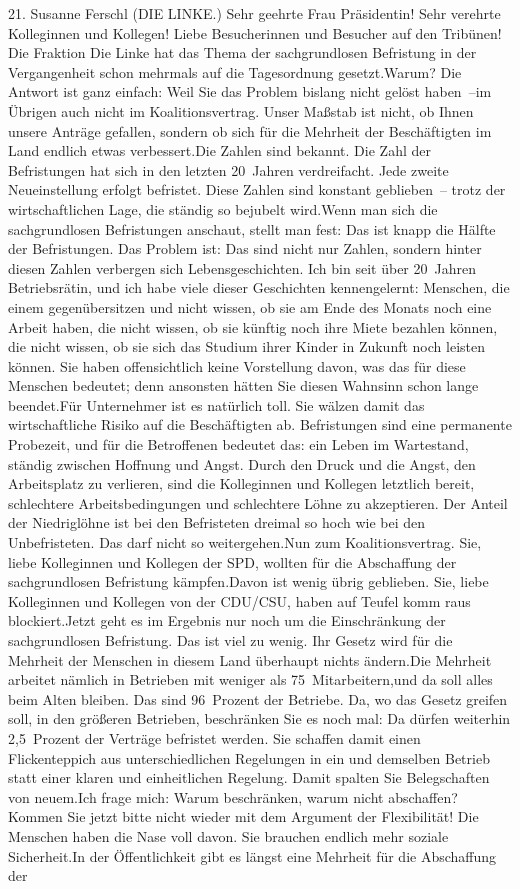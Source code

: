 \documentclass{article}
\begin{document}
	21. Susanne Ferschl (DIE LINKE.) Sehr geehrte Frau Präsidentin! Sehr verehrte Kolleginnen und Kollegen! Liebe Besucherinnen und Besucher auf den Tribünen! Die Fraktion Die Linke hat das Thema der sachgrundlosen Befristung in der Vergangenheit schon mehrmals auf die Tagesordnung gesetzt.Warum? Die Antwort ist ganz einfach: Weil Sie das Problem bislang nicht gelöst haben –im Übrigen auch nicht im Koalitionsvertrag. Unser Maßstab ist nicht, ob Ihnen unsere Anträge gefallen, sondern ob sich für die Mehrheit der Beschäftigten im Land endlich etwas verbessert.Die Zahlen sind bekannt. Die Zahl der Befristungen hat sich in den letzten 20 Jahren verdreifacht. Jede zweite Neueinstellung erfolgt befristet. Diese Zahlen sind konstant geblieben – trotz der wirtschaftlichen Lage, die ständig so bejubelt wird.Wenn man sich die sachgrundlosen Befristungen anschaut, stellt man fest: Das ist knapp die Hälfte der Befristungen. Das Problem ist: Das sind nicht nur Zahlen, sondern hinter diesen Zahlen verbergen sich Lebensgeschichten. Ich bin seit über 20 Jahren Betriebsrätin, und ich habe viele dieser Geschichten kennengelernt: Menschen, die einem gegenübersitzen und nicht wissen, ob sie am Ende des Monats noch eine Arbeit haben, die nicht wissen, ob sie künftig noch ihre Miete bezahlen können, die nicht wissen, ob sie sich das Studium ihrer Kinder in Zukunft noch leisten können. Sie haben offensichtlich keine Vorstellung davon, was das für diese Menschen bedeutet; denn ansonsten hätten Sie diesen Wahnsinn schon lange beendet.Für Unternehmer ist es natürlich toll. Sie wälzen damit das wirtschaftliche Risiko auf die Beschäftigten ab. Befristungen sind eine permanente Probezeit, und für die Betroffenen bedeutet das: ein Leben im Wartestand, ständig zwischen Hoffnung und Angst. Durch den Druck und die Angst, den Arbeitsplatz zu verlieren, sind die Kolleginnen und Kollegen letztlich bereit, schlechtere Arbeitsbedingungen und schlechtere Löhne zu akzeptieren. Der Anteil der Niedriglöhne ist bei den Befristeten dreimal so hoch wie bei den Unbefristeten. Das darf nicht so weitergehen.Nun zum Koalitionsvertrag. Sie, liebe Kolleginnen und Kollegen der SPD, wollten für die Abschaffung der sachgrundlosen Befristung kämpfen.Davon ist wenig übrig geblieben. Sie, liebe Kolleginnen und Kollegen von der CDU/CSU, haben auf Teufel komm raus blockiert.Jetzt geht es im Ergebnis nur noch um die Einschränkung der sachgrundlosen Befristung. Das ist viel zu wenig. Ihr Gesetz wird für die Mehrheit der Menschen in diesem Land überhaupt nichts ändern.Die Mehrheit arbeitet nämlich in Betrieben mit weniger als 75 Mitarbeitern,und da soll alles beim Alten bleiben. Das sind 96 Prozent der Betriebe. Da, wo das Gesetz greifen soll, in den größeren Betrieben, beschränken Sie es noch mal: Da dürfen weiterhin 2,5 Prozent der Verträge befristet werden. Sie schaffen damit einen Flickenteppich aus unterschiedlichen Regelungen in ein und demselben Betrieb statt einer klaren und einheitlichen Regelung. Damit spalten Sie Belegschaften von neuem.Ich frage mich: Warum beschränken, warum nicht abschaffen? Kommen Sie jetzt bitte nicht wieder mit dem Argument der Flexibilität! Die Menschen haben die Nase voll davon. Sie brauchen endlich mehr soziale Sicherheit.In der Öffentlichkeit gibt es längst eine Mehrheit für die Abschaffung der 
\end{document}
